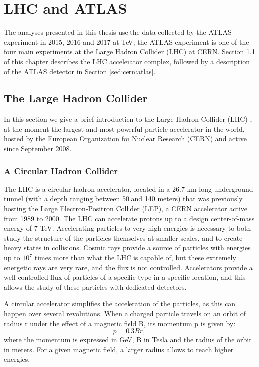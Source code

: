 \chapter{LHC and ATLAS}
\label{chap:cern}

The analyses presented in this thesis use the data collected by the ATLAS experiment in 2015, 2016 and 2017 at \cmtre TeV; the ATLAS experiment is one of the four main experiments at the Large Hadron Collider (LHC) at CERN. Section \ref{sed:cern:lhc} of this chapter describes the LHC accelerator complex, followed by a description of the ATLAS detector in Section \ref{sed:cern:atlas}.


\section{The Large Hadron Collider}
\label{sed:cern:lhc}

In this section we give a brief introduction to the Large Hadron Collider (LHC) \cite{1748-0221-3-08-S08001}, at the moment the largest and most powerful particle accelerator in the world, hosted by the European Organization for Nuclear Research (CERN) and active since September 2008.



\subsection{A Circular Hadron Collider}

The LHC is a circular hadron accelerator, located in a 26.7-km-long underground tunnel (with a depth ranging between 50 and 140 meters) that was previously hosting the Large Electron-Positron Collider (LEP), a CERN accelerator active from 1989 to 2000. The LHC can accelerate protons up to a design center-of-mass energy of 7 TeV. Accelerating particles to very high energies is necessary to both study the structure of the particles themselves at smaller scales, and to create heavy states in collisions. Cosmic rays provide a source of particles with energies up to $10^7$ times more than what the LHC is capable of, but these extremely energetic rays are very rare, and the flux is not controlled. Accelerators provide a well controlled flux of particles of a specific type in a specific location, and this allows the study of these particles with dedicated detectors.

A circular accelerator simplifies the acceleration of the particles, as this can happen over several revolutions. When a charged particle travels on an orbit of radius r under the effect of a magnetic field B, its momentum p is given by:
\begin{equation}
\label{eq:cern:p03br}
p = 0.3 B r,
\end{equation}
\noindent where the momentum is expressed in GeV, B in Tesla and the radius of the orbit in meters. For a given magnetic field, a larger radius allows to reach higher energies. 

